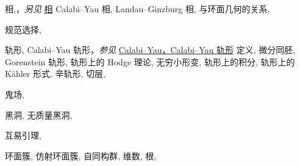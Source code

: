 \begin{theindex}
\subitem \leavevmode\hypertarget{idx:0361}{相},\enspace{}，\textit{另见} \hyperlink{idx:1042}{相}
\subsubitem \leavevmode\hypertarget{idx:0362}{Calabi--Yau 相},\enspace{}
\subsubitem \leavevmode\hypertarget{idx:0363}{Landau--Ginzburg 相},\enspace{}
\subitem \leavevmode\hypertarget{idx:0364}{与环面几何的关系},\enspace{}
\indexspace
\item \leavevmode\hypertarget{idx:0349}{规范选择},\enspace{}
\indexspace
\item \leavevmode\hypertarget{idx:0990}{轨形},\enspace{}
\subitem \leavevmode\hypertarget{idx:0991}{Calabi--Yau 轨形}，\textit{参见} \hyperlink{idx:0095}{Calabi--Yau，Calabi--Yau 轨形}
\subitem \leavevmode\hypertarget{idx:0992}{定义},\enspace{}
\subitem \leavevmode\hypertarget{idx:0993}{微分同胚},\enspace{}
\subitem \leavevmode\hypertarget{idx:0994}{Gorenstein 轨形},\enspace{}
\subitem \leavevmode\hypertarget{idx:0995}{轨形上的 Hodge 理论},\enspace{}
\subitem \leavevmode\hypertarget{idx:0996}{无穷小形变},\enspace{}
\subitem \leavevmode\hypertarget{idx:0997}{轨形上的积分},\enspace{}
\subitem \leavevmode\hypertarget{idx:0998}{轨形上的 Kähler 形式},\enspace{}
\subitem \leavevmode\hypertarget{idx:0999}{辛轨形},\enspace{}
\subitem \leavevmode\hypertarget{idx:1000}{切层},\enspace{}
\indexspace
\item \leavevmode\hypertarget{idx:0380}{鬼场},\enspace{}
\indexspace
\item \leavevmode\hypertarget{idx:0078}{黑洞},\enspace{}
\subitem \leavevmode\hypertarget{idx:0079}{无质量黑洞},\enspace{}
\indexspace
\item \leavevmode\hypertarget{idx:1207}{互易引理},\enspace{}
\indexspace
\item \leavevmode\hypertarget{idx:1353}{环面簇},\enspace{}
\subitem \leavevmode\hypertarget{idx:1354}{仿射环面簇},\enspace{}
\subitem \leavevmode\hypertarget{idx:1355}{自同构群},\enspace{}
\subsubitem \leavevmode\hypertarget{idx:1356}{维数},\enspace{}
\subsubitem \leavevmode\hypertarget{idx:1357}{根},\enspace{}

\end{theindex}
